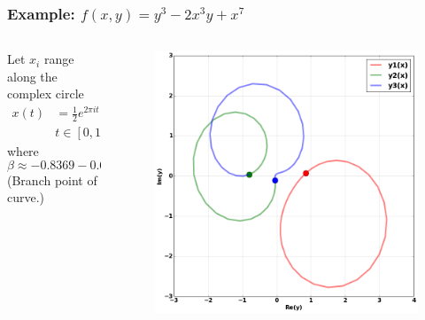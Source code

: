 \documentclass{beamer}
\begin{document}
\begin{frame}
  \frametitle{Example: $f(x,y) = y^3 - 2x^3y + x^7$}
  \begin{columns}
    \begin{column}{0.3\textwidth}
      Let $x_i$ range along the complex circle
      \begin{align*}
          x(t) &= \tfrac{1}{2}e^{2 \pi i t} + \beta \\
          & t \in [0,1]
      \end{align*}
      where
      \[
        \beta \approx -0.8369 - 0.6081j.
      \]
      {\small (Branch point of curve.)}
    \end{column}

    \begin{column}{0.7\textwidth}
      \begin{figure}
        \centering
        \includegraphics[width=\textwidth]{images/ancontsmalebranch.png}
      \end{figure}
    \end{column}
  \end{columns}
\end{frame}
\end{document}
